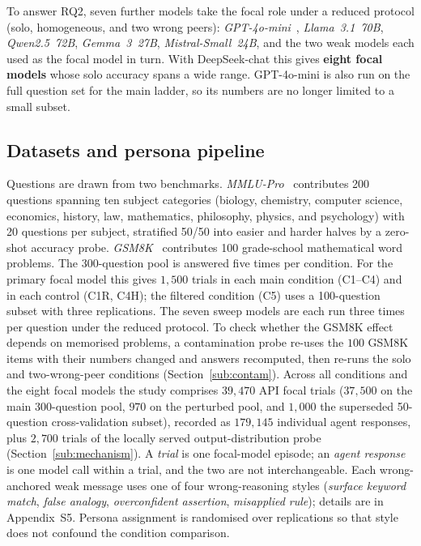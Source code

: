 \documentclass[11pt]{article}
\begin{document}
To answer RQ2, seven further models take the focal role under a reduced
protocol (solo, homogeneous, and two wrong peers):
\textit{GPT-4o-mini}~\citep{openai2024gpt4o}, \textit{Llama~3.1~70B},
\textit{Qwen2.5~72B}, \textit{Gemma~3~27B}, \textit{Mistral-Small~24B},
and the two weak models each used as the focal model in turn.
With DeepSeek-chat this gives \textbf{eight focal models} whose solo
accuracy spans a wide range.
GPT-4o-mini is also run on the full question set for the main ladder, so
its numbers are no longer limited to a small subset.

\subsection{Datasets and persona pipeline}
\label{sub:data}

Questions are drawn from two benchmarks.
\textit{MMLU-Pro}~\citep{wang2024mmlupro} contributes 200 questions spanning
ten subject categories (biology, chemistry, computer science, economics,
history, law, mathematics, philosophy, physics, and psychology) with
20 questions per subject, stratified 50/50 into easier and harder halves by
a zero-shot accuracy probe.
\textit{GSM8K}~\citep{cobbe2021training} contributes 100 grade-school
mathematical word problems.
The 300-question pool is answered five times per condition.
For the primary focal model this gives $1{,}500$ trials in each main
condition (C1--C4) and in each control (C1R, C4H); the filtered condition
(C5) uses a 100-question subset with three replications.
The seven sweep models are each run three times per question under the
reduced protocol.
To check whether the GSM8K effect depends on memorised problems, a
contamination probe re-uses the $100$ GSM8K items with their numbers
changed and answers recomputed, then re-runs the solo and two-wrong-peer
conditions (Section~\ref{sub:contam}).
Across all conditions and the eight focal models the study comprises
$39{,}470$ API focal trials ($37{,}500$ on the main 300-question pool, $970$ on
the perturbed pool, and $1{,}000$ the superseded 50-question cross-validation
subset), recorded as $179{,}145$ individual agent responses, plus $2{,}700$
trials of the locally served output-distribution probe
(Section~\ref{sub:mechanism}).
A \emph{trial} is one focal-model episode; an \emph{agent response} is one
model call within a trial, and the two are not interchangeable.
Each wrong-anchored weak message uses one of four wrong-reasoning styles
(\textit{surface keyword match}, \textit{false analogy},
\textit{overconfident assertion}, \textit{misapplied rule}); details are in
Appendix~S5.
Persona assignment is randomised over replications so that style does not
confound the condition comparison.
\end{document}
